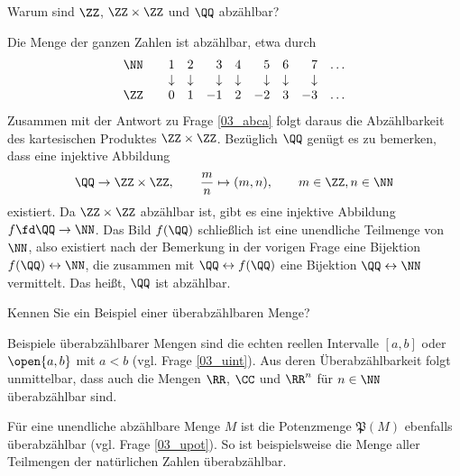 \begin{frage}\label{03_abzz}
  Warum sind $\ZZ$, $\ZZ\times \ZZ$ und $\QQ$ abzählbar?
\end{frage}

\begin{antwort}
  Die Menge der ganzen Zahlen ist abzählbar, etwa durch 
  \[
  \begin{array}{lrrrrrrrr}
    \NN\quad & 1 & 2 & 3 & 4 & 5 & 6 & 7 & \ldots \\
    &\downarrow&\downarrow&\downarrow&\downarrow&\downarrow&
    \downarrow&\downarrow & \\
    \ZZ\quad & 0 & 1 & -1 & 2 & -2 & 3 & -3 & \ldots 
  \end{array}
  \]
  Zusammen mit der Antwort zu Frage \ref{03_abca} 
  folgt daraus die Abzählbarkeit des 
  kartesischen Produktes $\ZZ \times \ZZ$. 
  Bezüglich $\QQ$ genügt es zu bemerken, dass eine injektive Abbildung  
  \[
  \QQ \to \ZZ\times \ZZ, \qquad 
  \frac{m}{n} \mapsto (m,n), \qquad m\in\ZZ, n\in\NN
  \]
  existiert. Da $\ZZ\times \ZZ$ abzählbar ist, gibt es eine 
  injektive Abbildung $f\fd\QQ\to\NN$. Das Bild $f(\QQ)$ schließlich 
  ist eine unendliche Teilmenge von $\NN$, also existiert nach der 
  Bemerkung in der vorigen Frage eine Bijektion 
  $f(\QQ) \leftrightarrow \NN$, die zusammen 
  mit $\QQ \leftrightarrow f(\QQ)$ eine Bijektion 
  $\QQ \leftrightarrow \NN$ vermittelt. Das heißt, $\QQ$ ist abzählbar. 
  \AntEnd
\end{antwort}

\begin{frage}\label{03_ueba}
  Kennen Sie ein Beispiel einer überabzählbaren Menge?
\end{frage}

\begin{antwort}
  Beispiele überabzählbarer Mengen sind die 
  echten reellen Intervalle $[a,b]$ oder $\open{a,b}$ 
  mit $a<b$ (vgl. Frage \ref{03_uint}). 
  Aus deren Überabzählbarkeit folgt unmittelbar, dass auch die Mengen 
  $\RR$, $\CC$ und $\RR^n$ für $n\in\NN$ überabzählbar sind.

  Für eine unendliche abzählbare Menge $M$ ist die Potenzmenge 
  $\mathfrak{P}(M)$ 
  ebenfalls überabzählbar (vgl. Frage \ref{03_upot}). 
  So ist beispielsweise die Menge aller Teilmengen der natürlichen Zahlen 
  überabzählbar.
  \AntEnd
\end{antwort}


